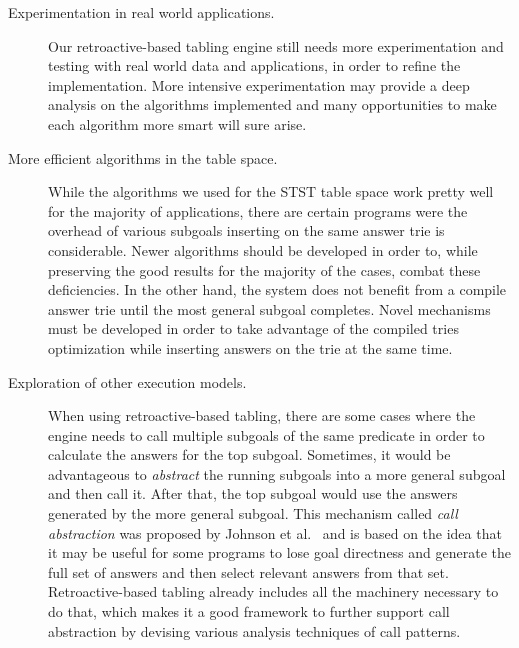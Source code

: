 \begin{description}
   
   \item[Experimentation in real world applications.] Our retroactive-based tabling engine still needs more
   experimentation and testing with real world data and applications, in order to refine the implementation.
   More intensive experimentation may provide a deep analysis on the algorithms implemented and many opportunities
   to make each algorithm more smart will sure arise.
   
   \item[More efficient algorithms in the table space.] While the algorithms we used for the STST table space
   work pretty well for the majority of applications, there are certain programs were the overhead of various
   subgoals inserting on the same answer trie is considerable. Newer algorithms should be developed in order to,
   while preserving the good results for the majority of the cases, combat these deficiencies. In the other hand,
   the system does not benefit from a compile answer trie until the most general subgoal completes. Novel mechanisms
   must be developed in order to take advantage of the compiled tries optimization while inserting answers on the trie
   at the same time.
   
   \item[Exploration of other execution models.] When using retroactive-based tabling, there are some cases where the
   engine needs to call multiple subgoals of the same predicate in order to calculate the answers for the top subgoal.
   Sometimes, it would be advantageous to \emph{abstract} the running subgoals into a more general subgoal and then
   call it. After that, the top subgoal would use the answers generated by the more general subgoal. This mechanism
   called \emph{call abstraction} was proposed by Johnson et al.~\cite{Johnson-99} and is based on the idea that it
   may be useful for some programs to lose goal directness and generate the full set of answers and then select relevant
   answers from that set. Retroactive-based tabling already includes all the machinery necessary to do that, which makes
   it a good framework to further support call abstraction by devising various analysis techniques of call patterns.
   
\end{description}
